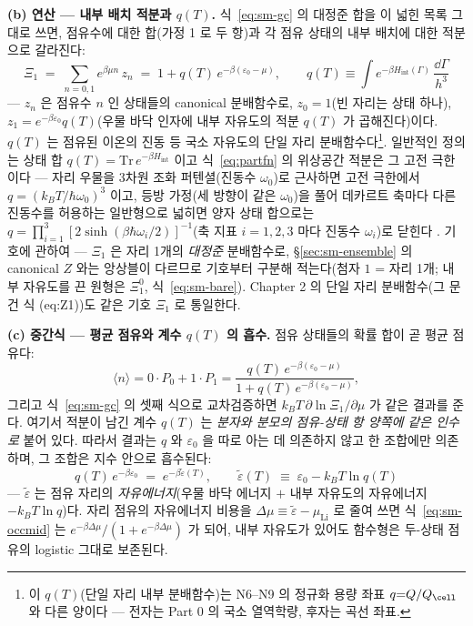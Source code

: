 \textbf{(b) 연산 --- 내부 배치 적분과 $q(T)$.} 식~\eqref{eq:sm-gc} 의 대정준 합을 이 넓힌 목록
그대로 쓰면, 점유수에 대한 합(가정 1 로 두 항)과 각 점유 상태의 내부 배치에 대한 적분으로 갈라진다:
\begin{equation}
\Xi_1\;=\;\sum_{n=0,1}e^{\beta\mu n}\,z_n
\;=\;1+q(T)\,e^{-\beta(\varepsilon_0-\mu)},
\qquad
q(T)\equiv\int e^{-\beta H_\mathrm{int}(\Gamma)}\,\frac{\dd\Gamma}{h^3}
\label{eq:partfn}
\end{equation}
--- $z_n$ 은 점유수 $n$ 인 상태들의 canonical 분배함수로, $z_0=1$(빈 자리는 상태 하나),
$z_1=e^{-\beta\varepsilon_0}q(T)$(우물 바닥 인자에 내부 자유도의 적분 $q(T)$ 가 곱해진다)이다.
$q(T)$ 는 점유된 이온의 진동 등 국소 자유도의 단일 자리 분배함수다\footnote{이 $q(T)$(단일 자리 내부 분배함수)는 N6--N9 의 정규화 용량 좌표 $q{=}Q/Q_\cell$ 와 다른 양이다 --- 전자는 Part 0 의 국소 열역학량, 후자는 곡선 좌표.}. 일반적인 정의는 상태
합 $q(T)=\mathrm{Tr}\,e^{-\beta H_\mathrm{int}}$ 이고 식~\eqref{eq:partfn} 의 위상공간 적분은 그 고전
극한이다 --- 자리 우물을 3차원 조화 퍼텐셜(진동수 $\omega_0$)로 근사하면 고전 극한에서
$q=(k_BT/\hbar\omega_0)^3$ 이고, 등방 가정(세 방향이 같은 $\omega_0$)을 풀어 데카르트 축마다 다른
진동수를 허용하는 일반형으로 넓히면 양자 상태 합으로는
$q=\prod_{i=1}^{3}[2\sinh(\beta\hbar\omega_i/2)]^{-1}$(축 지표 $i=1,2,3$ 마다 진동수 $\omega_i$)로
닫힌다 \cite{hill1960}. 기호에 관하여 --- $\Xi_1$ 은 자리 1개의 \emph{대정준} 분배함수로,
\S\ref{sec:sm-ensemble} 의 canonical $Z$ 와는 앙상블이 다르므로 기호부터 구분해 적는다(첨자 $1$ = 자리
1개; 내부 자유도를 끈 원형은 $\Xi_1^0$, 식~\eqref{eq:sm-bare}). Chapter 2 의 단일 자리
분배함수(그 문건 식 (eq:Z1))도 같은 기호 $\Xi_1$ 로 통일한다.

\textbf{(c) 중간식 --- 평균 점유와 계수 $q(T)$ 의 흡수.} 점유 상태들의 확률 합이 곧 평균 점유다:
\begin{equation}
\langle n\rangle=0\cdot P_0+1\cdot P_1
=\frac{q(T)\,e^{-\beta(\varepsilon_0-\mu)}}{1+q(T)\,e^{-\beta(\varepsilon_0-\mu)}},
\label{eq:sm-occmid}
\end{equation}
그리고 식~\eqref{eq:sm-gc} 의 셋째 식으로 교차검증하면 $k_BT\,\partial\ln\Xi_1/\partial\mu$ 가 같은
결과를 준다. 여기서 적분이 남긴 계수 $q(T)$ 는 \emph{분자와 분모의 점유-상태 항 양쪽에 같은 인수로}
붙어 있다. 따라서 결과는 $q$ 와 $\varepsilon_0$ 을 따로 아는 데 의존하지 않고 한 조합에만 의존하며,
그 조합은 지수 안으로 흡수된다:
\begin{equation}
q(T)\,e^{-\beta\varepsilon_0}\;=\;e^{-\beta\tilde\varepsilon(T)},
\qquad
\tilde\varepsilon(T)\;\equiv\;\varepsilon_0-k_BT\ln q(T)
\label{eq:sm-epstilde}
\end{equation}
--- $\tilde\varepsilon$ 는 점유 자리의 \emph{자유에너지}(우물 바닥 에너지 $+$ 내부 자유도의 자유에너지
$-k_BT\ln q$)다. 자리 점유의 자유에너지 비용을 $\Delta\mu\equiv\tilde\varepsilon-\mu_\mathrm{Li}$ 로
줄여 쓰면 식~\eqref{eq:sm-occmid} 는 $e^{-\beta\Delta\mu}/(1+e^{-\beta\Delta\mu})$ 가 되어, 내부
자유도가 있어도 함수형은 두-상태 점유의 logistic 그대로 보존된다.

